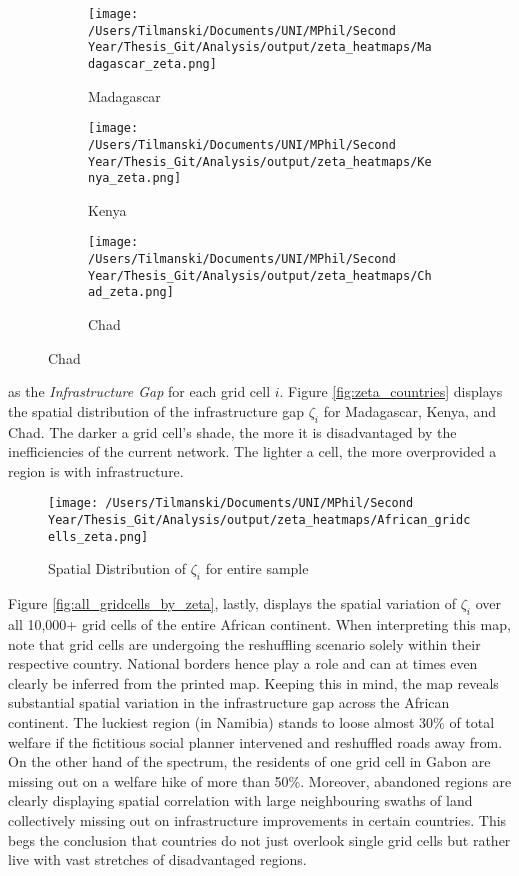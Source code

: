 \documentclass[11pt, oneside]{article}   	%
\begin{document}
\begin{figure}
\centering
\caption{Spatial Distribution of $\zeta_{i}$ for sample countries}

\begin{subfigure}[c]{0.32\textwidth}
\texttt{[image: /Users/Tilmanski/Documents/UNI/MPhil/Second Year/Thesis\_Git/Analysis/output/zeta\_heatmaps/Madagascar\_zeta.png]}
\caption{Madagascar}
\label{fig:Madagascar_zeta}
\end{subfigure}
\begin{subfigure}[c]{0.32\textwidth}
\texttt{[image: /Users/Tilmanski/Documents/UNI/MPhil/Second Year/Thesis\_Git/Analysis/output/zeta\_heatmaps/Kenya\_zeta.png]}
\caption{Kenya}
\label{fig:Kenya_zeta}
\end{subfigure}
\begin{subfigure}[c]{0.32\textwidth}
\texttt{[image: /Users/Tilmanski/Documents/UNI/MPhil/Second Year/Thesis\_Git/Analysis/output/zeta\_heatmaps/Chad\_zeta.png]}
\caption{Chad}
\label{fig:Chad_zeta}
\end{subfigure}
\label{fig:zeta_countries}
\end{figure}

as the \emph{Infrastructure Gap} for each grid cell $i$. Figure \eqref{fig:zeta_countries} displays the spatial distribution of the infrastructure gap $\zeta_{i}$ for Madagascar, Kenya, and Chad. The darker a grid cell's shade, the more it is disadvantaged by the inefficiencies of the current network. The lighter a cell, the more overprovided a region is with infrastructure.

\begin{figure}
\centering
\caption{Spatial Distribution of $\zeta_{i}$ for entire sample}
\texttt{[image: /Users/Tilmanski/Documents/UNI/MPhil/Second Year/Thesis\_Git/Analysis/output/zeta\_heatmaps/African\_gridcells\_zeta.png]}

\label{fig:all_gridcells_by_zeta}
\end{figure}

Figure \eqref{fig:all_gridcells_by_zeta}, lastly, displays the spatial variation of $\zeta_{i}$ over all 10,000+ grid cells of the entire African continent. When interpreting this map, note that grid cells are undergoing the reshuffling scenario solely within their respective country. National borders hence play a role and can at times even clearly be inferred from the printed map. Keeping this in mind, the map reveals substantial spatial variation in the infrastructure gap across the African continent. The luckiest region (in Namibia) stands to loose almost 30\% of total welfare if the fictitious social planner intervened and reshuffled roads away from. On the other hand of the spectrum, the residents of one grid cell in Gabon are missing out on a welfare hike of more than 50\%. Moreover, abandoned regions are clearly displaying spatial correlation with large neighbouring swaths of land collectively missing out on infrastructure improvements in certain countries. This begs the conclusion that countries do not just overlook single grid cells but rather live with vast stretches of disadvantaged regions.
\end{document}
